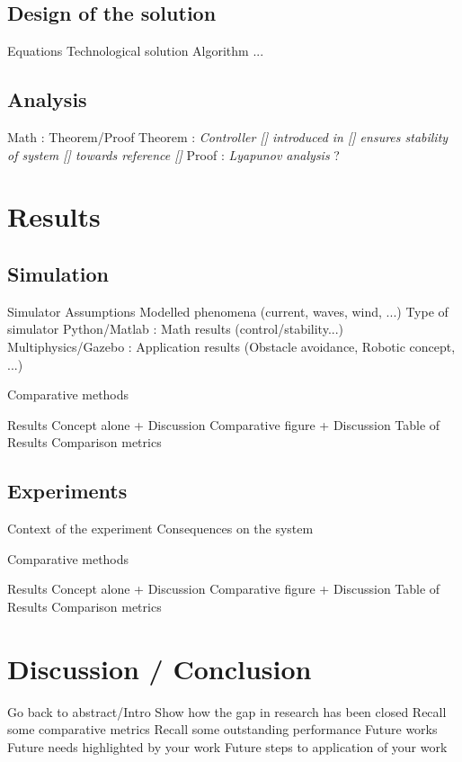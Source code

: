 \documentclass[twocolumn]{article}
\begin{document}
\subsection{Design of the solution}
\begin{outline}
\1 Equations
\1 Technological solution
\1 Algorithm
\1 ...
\end{outline}
\subsection{Analysis}
\begin{outline}
\1 Math : Theorem/Proof
\2 Theorem : \emph{Controller [] introduced in [] ensures stability of system [] towards reference []}
\2 Proof : \emph{Lyapunov analysis}
\1 ?
\end{outline}

\section{Results}
\subsection{Simulation}
\begin{outline}
\1 Simulator
\2 Assumptions
\2 Modelled phenomena (current, waves, wind, ...)
\2 Type of simulator 
\3 Python/Matlab : Math results (control/stability...)
\3 Multiphysics/Gazebo : Application results (Obstacle avoidance, Robotic concept, ...)

\1 Comparative methods

\1 Results
\2 Concept alone + Discussion
\2 Comparative figure + Discussion
\2 Table of Results
\3 Comparison metrics

\end{outline}


\subsection{Experiments}
\begin{outline}
\1 Context of the experiment
\2 Consequences on the system


\1 Comparative methods

\1 Results
\2 Concept alone + Discussion
\2 Comparative figure + Discussion
\2 Table of Results
\3 Comparison metrics
\end{outline}

\section{Discussion / Conclusion}
\begin{outline}
\1 Go back to abstract/Intro
\1 Show how the gap in research has been closed
\2 Recall some comparative metrics
\2 Recall some outstanding performance
\1 Future works
\2 Future needs highlighted by your work
\2 Future steps to application of your work
\end{outline}




\end{document}

